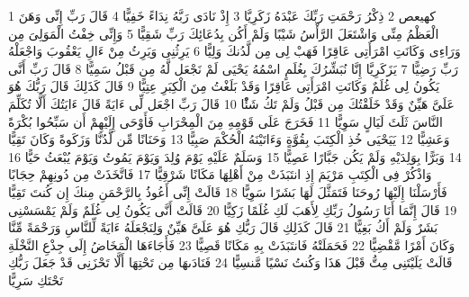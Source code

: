 \documentclass[20pt,a4paper]{article}
\title{}
\author{}
\date{}
\begin{document}
\pagecolor{cl_page}



{\tiny\colorbox{cl_aya}{1}} كهيعص
{\tiny\colorbox{cl_aya}{2}} ذِكْرُ رَحْمَتِ رَبِّكَ عَبْدَهُ زَكَرِيَّا
{\tiny\colorbox{cl_aya}{3}} إِذْ نَادَى رَبَّهُ نِدَاءً خَفِيًّا
{\tiny\colorbox{cl_aya}{4}} قَالَ رَبِّ إِنِّى وَهَنَ الْعَظْمُ مِنِّى وَاشْتَعَلَ الرَّأْسُ شَيْبًا وَلَمْ أَكُن بِدُعَائِكَ رَبِّ شَقِيًّا
{\tiny\colorbox{cl_aya}{5}} وَإِنِّى خِفْتُ الْمَوَلِىَ مِن وَرَاءِى وَكَانَتِ امْرَأَتِى عَاقِرًا فَهَبْ لِى مِن لَّدُنكَ وَلِيًّا
{\tiny\colorbox{cl_aya}{6}} يَرِثُنِى وَيَرِثُ مِنْ ءَالِ يَعْقُوبَ وَاجْعَلْهُ رَبِّ رَضِيًّا
{\tiny\colorbox{cl_aya}{7}} يَزَكَرِيَّا إِنَّا نُبَشِّرُكَ بِغُلَمٍ اسْمُهُ يَحْيَى لَمْ نَجْعَل لَّهُ مِن قَبْلُ سَمِيًّا
{\tiny\colorbox{cl_aya}{8}} قَالَ رَبِّ أَنَّى يَكُونُ لِى غُلَمٌ وَكَانَتِ امْرَأَتِى عَاقِرًا وَقَدْ بَلَغْتُ مِنَ الْكِبَرِ عِتِيًّا
{\tiny\colorbox{cl_aya}{9}} قَالَ كَذَلِكَ قَالَ رَبُّكَ هُوَ عَلَىَّ هَيِّنٌ وَقَدْ خَلَقْتُكَ مِن قَبْلُ وَلَمْ تَكُ شَئًْا
{\tiny\colorbox{cl_aya}{10}} قَالَ رَبِّ اجْعَل لِّى ءَايَةً قَالَ ءَايَتُكَ أَلَّا تُكَلِّمَ النَّاسَ ثَلَثَ لَيَالٍ سَوِيًّا
{\tiny\colorbox{cl_aya}{11}} فَخَرَجَ عَلَى قَوْمِهِ مِنَ الْمِحْرَابِ فَأَوْحَى إِلَيْهِمْ أَن سَبِّحُوا بُكْرَةً وَعَشِيًّا
{\tiny\colorbox{cl_aya}{12}} يَيَحْيَى خُذِ الْكِتَبَ بِقُوَّةٍ وَءَاتَيْنَهُ الْحُكْمَ صَبِيًّا
{\tiny\colorbox{cl_aya}{13}} وَحَنَانًا مِّن لَّدُنَّا وَزَكَوةً وَكَانَ تَقِيًّا
{\tiny\colorbox{cl_aya}{14}} وَبَرًّا بِوَلِدَيْهِ وَلَمْ يَكُن جَبَّارًا عَصِيًّا
{\tiny\colorbox{cl_aya}{15}} وَسَلَمٌ عَلَيْهِ يَوْمَ وُلِدَ وَيَوْمَ يَمُوتُ وَيَوْمَ يُبْعَثُ حَيًّا
{\tiny\colorbox{cl_aya}{16}} وَاذْكُرْ فِى الْكِتَبِ مَرْيَمَ إِذِ انتَبَذَتْ مِنْ أَهْلِهَا مَكَانًا شَرْقِيًّا
{\tiny\colorbox{cl_aya}{17}} فَاتَّخَذَتْ مِن دُونِهِمْ حِجَابًا فَأَرْسَلْنَا إِلَيْهَا رُوحَنَا فَتَمَثَّلَ لَهَا بَشَرًا سَوِيًّا
{\tiny\colorbox{cl_aya}{18}} قَالَتْ إِنِّى أَعُوذُ بِالرَّحْمَنِ مِنكَ إِن كُنتَ تَقِيًّا
{\tiny\colorbox{cl_aya}{19}} قَالَ إِنَّمَا أَنَا رَسُولُ رَبِّكِ لِأَهَبَ لَكِ غُلَمًا زَكِيًّا
{\tiny\colorbox{cl_aya}{20}} قَالَتْ أَنَّى يَكُونُ لِى غُلَمٌ وَلَمْ يَمْسَسْنِى بَشَرٌ وَلَمْ أَكُ بَغِيًّا
{\tiny\colorbox{cl_aya}{21}} قَالَ كَذَلِكِ قَالَ رَبُّكِ هُوَ عَلَىَّ هَيِّنٌ وَلِنَجْعَلَهُ ءَايَةً لِّلنَّاسِ وَرَحْمَةً مِّنَّا وَكَانَ أَمْرًا مَّقْضِيًّا
{\tiny\colorbox{cl_aya}{22}} فَحَمَلَتْهُ فَانتَبَذَتْ بِهِ مَكَانًا قَصِيًّا
{\tiny\colorbox{cl_aya}{23}} فَأَجَاءَهَا الْمَخَاضُ إِلَى جِذْعِ النَّخْلَةِ قَالَتْ يَلَيْتَنِى مِتُّ قَبْلَ هَذَا وَكُنتُ نَسْيًا مَّنسِيًّا
{\tiny\colorbox{cl_aya}{24}} فَنَادَىهَا مِن تَحْتِهَا أَلَّا تَحْزَنِى قَدْ جَعَلَ رَبُّكِ تَحْتَكِ سَرِيًّا
\end{document}
